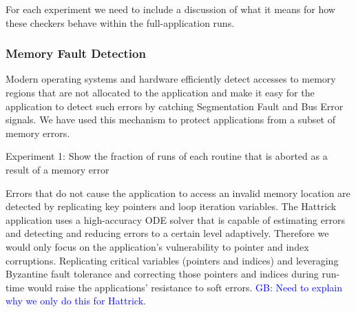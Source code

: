 \documentclass[prodmode,acmtecs]{acmconf} %
\newcommand{\greg}[1]{%
  \textcolor{blue}{GB: #1}
}
\begin{document}
For each experiment we need to include a discussion of what it means for how these checkers behave within the full-application runs.




\subsubsection{Memory Fault Detection}
\label{sec:res_tech:err_det:mem}

Modern operating systems and hardware efficiently detect accesses to memory regions that are not allocated to the application and make it easy for the application to detect such errors by catching Segmentation Fault and Bus Error signals.
We have used this mechanism to protect applications from a subset of memory errors.


Experiment 1: Show the fraction of runs of each routine that is aborted as a result of a memory error

Errors that do not cause the application to access an invalid memory location are detected by replicating key pointers and loop iteration variables.
The Hattrick application uses a high-accuracy ODE solver that is capable of estimating errors and detecting and reducing errors to a certain level adaptively. 
Therefore we would only focus on the application's vulnerability to pointer and index corruptions. 
Replicating critical variables (pointers and indices) and leveraging Byzantine fault tolerance and correcting those pointers and indices during run-time would raise the applications' resistance to soft errors.
\greg{Need to explain why we only do this for Hattrick.}
\end{document}
